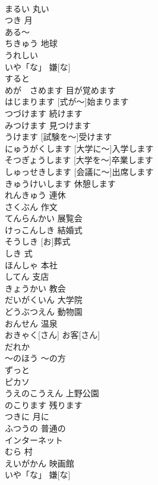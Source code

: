 \documentclass[8pt]{extreport}
\begin{document}
\begin{CJK}{UTF8}{min}
\\	まるい	丸い	
\\	つき	月	
\\	ある～			
\\	ちきゅう	地球	
\\	うれしい			
\\	いや「な」	嫌[な]	
\\	すると			
\\	めが　さめます	目が覚めます	
\\	[しきが～]はじまります	[式が～]始まります	
\\	つづけます	続けます	
\\	みつけます	見つけます	
\\	[しけんを～]うけます	[試験を～]受けます	
\\	[だいがくに～] にゅうがくします	[大学に～]入学します	
\\	[だいがくを～]そつぎょうします	[大学を～]卒業します	
\\	[かいぎに～] しゅっせきします	[会議に～]出席します	
\\	きゅうけいします	休憩します	
\\	れんきゅう	連休	
\\	さくぶん	作文	
\\	てんらんかい	展覧会	
\\	けっこんしき	結婚式	
\\	[お]そうしき	[お]葬式	
\\	しき	式	
\\	ほんしゃ	本社	
\\	してん	支店	
\\	きょうかい	教会	
\\	だいがくいん	大学院	
\\	どうぶつえん	動物園	
\\	おんせん	温泉	
\\	おきゃく[さん]	お客[さん]	
\\	だれか			
\\	～のほう	～の方	
\\	ずっと			
\\	ピカソ			
\\	うえのこうえん	上野公園	
\\	のこります	残ります	
\\	つきに	月に	
\\	ふつうの	普通の	
\\	インターネット			
\\	むら	村	
\\	えいがかん	映画館	
\\	いや「な」	嫌[な]	

\end{CJK}
\end{document}
